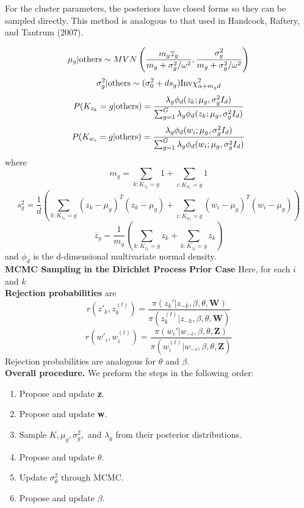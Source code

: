 \documentclass[12pt]{article}
\newcommand{\tx}[1]{\textnormal{#1}}
\begin{document}
    For the cluster parameters, the posteriors have closed forms so they can be sampled directly. This method is analogous to that used in Handcock, Raftery, and Tantrum (2007).
    
    $$\mu_{g}|\tx{others}\sim MVN\left(\frac{m_g\overline{z}_g}{m_g+\sigma_g^2/\omega^2},\frac{\sigma_g^2}{m_g+\sigma_g^2/\omega^2}\right)$$ $$\sigma_g^2|\tx{others}\sim (\sigma_0^2+ds_g)\tx{Inv}\chi^2_{\alpha+m_gd}$$ $$P(K_{z_k}=g|\tx{others})=\frac{\lambda_{g}\phi_d(z_k;\mu_{g},\sigma_{g}^2I_d)}{\sum_{g=1}^{G}\lambda_{g}\phi_d(z_k;\mu_{g},\sigma_{g}^2I_d)}$$ $$P(K_{w_i}=g|\tx{others})=\frac{\lambda_{g}\phi_d(w_i;\mu_{g},\sigma_{g}^2I_d)}{\sum_{g=1}^{G}\lambda_{g}\phi_d(w_i;\mu_{g},\sigma_{g}^2I_d)}$$where $$m_g=\sum_{k:K_{z_k}=g}1+\sum_{i:K_{w_i}=g}1$$ $$s_g^2=\frac{1}{d}\left(\sum_{k:K_{z_k}=g}(z_k-\mu_g)^T(z_k-\mu_g)+\sum_{i:K_{w_i}=g}(w_i-\mu_g)^T(w_i-\mu_g)\right)$$ $$\overline{z}_g=\frac{1}{m_g}\left(\sum_{k:K_{z_k}=g}z_k+\sum_{k:K_{z_k}=g}z_k\right)$$ and $\phi_d$ is the d-dimensional multivariate normal density.\\ 
    
    \textbf{MCMC Sampling in the Dirichlet Process Prior Case} Here, for each $i$ and $k$ \\
     
  \textbf{Rejection probabilities} are  $$r(z'_k,z_k^{(t)})=\frac{\pi(z_k'|z_{-k},\beta,\theta,\textbf{W})}{\pi(z_k^{(t)}|z_{-k},\beta,\theta,\textbf{W})}$$ $$r(w'_i,w_i^{(t)})=\frac{\pi(w_i'|w_{-i},\beta,\theta,\textbf{Z})}{\pi(w_i^{(t)}|w_{-i},\beta,\theta,\textbf{Z})}$$
Rejection probabilities are analogous for $\theta$ and $\beta$.\\

\textbf{Overall procedure.} We preform the steps in the following order:

\begin{enumerate}
	\item Propose and update \textbf{z}. 
	\item Propose and update \textbf{w}.
	\item Sample $K,\mu_{g},\sigma_{g}^2,$ and $\lambda_{g}$ from their posterior distributions.
	\item Propose and update $\theta$.
	\item Update $\sigma_\theta^2$ through MCMC.
	\item Propose and update $\beta$.
\end{enumerate}
\end{document}
